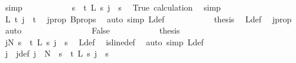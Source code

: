 \begin{isabellebody}
\ simp\isanewline
\ \ \ \ \ \ \ \ \isamarkupfalse%
\ \isamarkupfalse%
\ {\isachardoublequoteopen}{\isasymforall}s\ {\isacharless}{\kern0pt}\ t{\isachardot}{\kern0pt}\ L{\isacharprime}{\kern0pt}\ s\ j\ {\isacharequal}{\kern0pt}\ s{\isachardoublequoteclose}\ \isamarkupfalse%
\ True\ calculation\ \isamarkupfalse%
\ simp\isanewline
\ \ \ \ \ \ \ \ \isamarkupfalse%
\ \isamarkupfalse%
\ {\isachardoublequoteopen}L{\isacharprime}{\kern0pt}\ t\ j\ {\isacharequal}{\kern0pt}\ t{\isachardoublequoteclose}\ \isamarkupfalse%
\ j{\isacharunderscore}{\kern0pt}prop\ B{\isacharunderscore}{\kern0pt}props\ \isamarkupfalse%
\ {\isacharparenleft}{\kern0pt}auto\ simp{\isacharcolon}{\kern0pt}\ L{\isacharprime}{\kern0pt}{\isacharunderscore}{\kern0pt}def{\isacharparenright}{\kern0pt}\isanewline
\ \ \ \ \ \ \ \ \isamarkupfalse%
\ \isamarkupfalse%
\ {\isacharquery}{\kern0pt}thesis\ \isamarkupfalse%
\ L{\isacharprime}{\kern0pt}{\isacharunderscore}{\kern0pt}def\ \isamarkupfalse%
\ j{\isacharunderscore}{\kern0pt}prop\ \isamarkupfalse%
\ auto\isanewline
\ \ \ \ \ \ \isamarkupfalse%
\isanewline
\ \ \ \ \ \ \ \ \isamarkupfalse%
\ False\isanewline
\ \ \ \ \ \ \ \ \isamarkupfalse%
\ \isamarkupfalse%
\ {\isacharquery}{\kern0pt}thesis\isanewline
\ \ \ \ \ \ \ \ \isamarkupfalse%
{\isacharminus}{\kern0pt}\isanewline
\ \ \ \ \ \ \ \ \ \ \isamarkupfalse%
\ {\isachardoublequoteopen}{\isacharparenleft}{\kern0pt}{\isasymexists}j{\isacharless}{\kern0pt}N{\isacharprime}{\kern0pt}{\isachardot}{\kern0pt}\ {\isacharparenleft}{\kern0pt}{\isasymforall}s\ {\isacharless}{\kern0pt}\ t{\isachardot}{\kern0pt}\ L{\isacharprime}{\kern0pt}\ s\ j\ {\isacharequal}{\kern0pt}\ s{\isacharparenright}{\kern0pt}{\isacharparenright}{\kern0pt}{\isachardoublequoteclose}\ \isamarkupfalse%
\ L{\isacharunderscore}{\kern0pt}def\ \isamarkupfalse%
\ is{\isacharunderscore}{\kern0pt}line{\isacharunderscore}{\kern0pt}def\ \isamarkupfalse%
\ {\isacharparenleft}{\kern0pt}auto\ simp{\isacharcolon}{\kern0pt}\ L{\isacharprime}{\kern0pt}{\isacharunderscore}{\kern0pt}def{\isacharparenright}{\kern0pt}\isanewline
\ \ \ \ \ \ \ \ \ \ \isamarkupfalse%
\ \isamarkupfalse%
\ j\ \ j{\isacharunderscore}{\kern0pt}def{\isacharcolon}{\kern0pt}\ {\isachardoublequoteopen}j\ {\isacharless}{\kern0pt}\ N{\isacharprime}{\kern0pt}\ {\isasymand}\ {\isacharparenleft}{\kern0pt}{\isasymforall}s\ {\isacharless}{\kern0pt}\ t{\isachardot}{\kern0pt}\ L{\isacharprime}{\kern0pt}\ s\ j\ {\isacharequal}{\kern0pt}\ s{\isacharparenright}{\kern0pt}{\isachardoublequoteclose}\ \isamarkupfalse%

\end{isabellebody}
